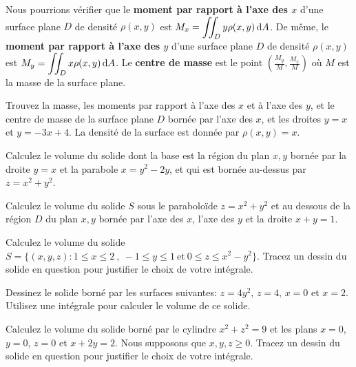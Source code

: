 \begin{question}
Nous pourrions vérifier que le {\bfseries moment par rapport à l'axe des
$x$} d'une surface plane
$D$ de densité $\rho(x,y)$ est
$\displaystyle M_x = \iint_D y \rho(x,y) \,\mathrm{d}A$.  De même,
le {\bfseries moment par rapport à l'axe des $y$} d'une surface plane $D$ de densité
$\rho(x,y)$ est
$\displaystyle M_y = \iint_D x \rho(x,y) \,\mathrm{d}A$.   Le
{\bfseries centre de masse} est le point
$\displaystyle \left(\frac{M_y}{M}, \frac{M_x}{M}\right)$ où $M$ est
la masse de la surface plane.

Trouvez la masse, les moments par rapport à l'axe des $x$ et à l'axe
des $y$, et le centre de masse de la surface plane $D$ bornée par
l'axe des $x$, et les droites $y=x$ et $y = -3x + 4$.  La densité de
la surface est donnée par $\rho(x,y) = x$.
\label{16Q5}
\end{question}

\begin{question}
Calculez le volume du solide dont la base est la région du plan $x,y$ bornée
par la droite $y=x$ et la parabole $x=y^2-2y$, et qui est bornée au-dessus
par $z=x^2+y^2$.
\label{16Q6}
\end{question}

\begin{question}
Calculez le volume du solide $S$ sous le paraboloïde $z = x^2 +y^2$ et
au dessous de la région $D$ du plan $x,y$ bornée par l'axe des $x$, l'axe
des $y$ et la droite $x+y=1$.
\label{16Q7}
\end{question}

\begin{question}
Calculez le volume du solide $S = \{ (x,y,z) : 1 \leq x \leq 2 \ , \
-1 \leq y \leq 1 \ \text{et} \ 0 \leq z \leq x^2-y^2 \}$.  Tracez un
dessin du solide en question pour justifier le choix de votre
intégrale.
\label{16Q8}
\end{question}

\begin{question}
Dessinez le solide borné par les surfaces suivantes:
$z = 4y^2$, $z = 4$, $x=0$ et $x = 2$.
Utilisez une intégrale pour calculer le volume de ce solide.
\label{16Q9}
\end{question}

\begin{question}
Calculez le volume du solide borné par le cylindre $x^2+z^2 = 9$ et les plans
$x=0$, $y=0$, $z=0$ et $x+2y = 2$.  Nous supposons que $x,y,z \geq 0$.
Tracez un dessin du solide en question pour justifier le choix de
votre intégrale.
\label{16Q10}
\end{question}

